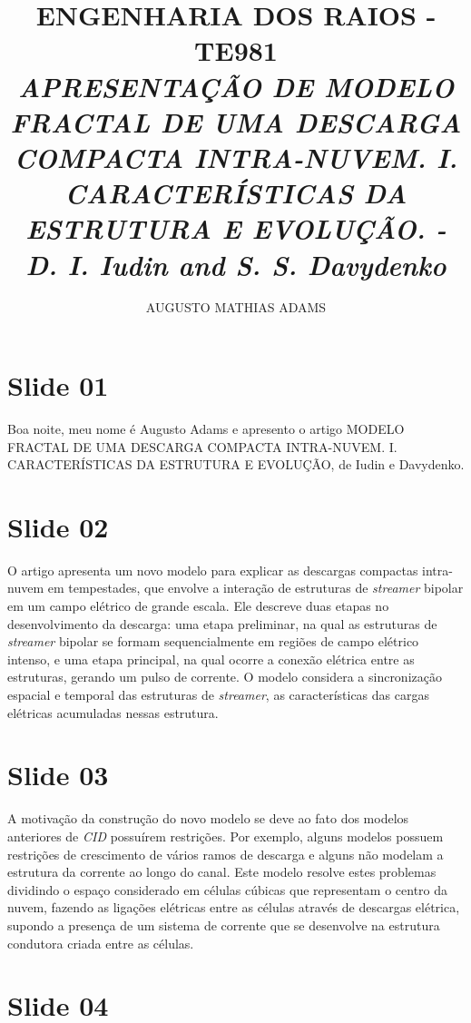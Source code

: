 \documentclass[a4paper, 12pt, onecolumn,singlespacing]{article}
\title{\normalsize{ENGENHARIA DOS RAIOS - TE981}\\ \huge{\textbf\textit{{APRESENTAÇÃO DE MODELO FRACTAL DE UMA DESCARGA COMPACTA INTRA-NUVEM. I. CARACTERÍSTICAS DA ESTRUTURA E EVOLUÇÃO. - D. I. Iudin and S. S. Davydenko}}\\}}
\author{\small{AUGUSTO MATHIAS ADAMS}}
\begin{document}
	
	\maketitle
	
	\section{Slide 01}
	
	Boa noite, meu nome é Augusto Adams e apresento o artigo MODELO FRACTAL DE UMA DESCARGA COMPACTA INTRA-NUVEM. I. CARACTERÍSTICAS DA ESTRUTURA E EVOLUÇÃO, de Iudin e Davydenko.
	
	\section{Slide 02}
	
		O artigo apresenta um novo modelo para explicar as descargas compactas intra-nuvem em tempestades, que envolve a interação de estruturas de \textit{streamer} bipolar em um campo elétrico de grande escala. Ele descreve duas etapas no desenvolvimento da descarga: uma etapa preliminar, na qual as estruturas de \textit{streamer} bipolar se formam sequencialmente em regiões de campo elétrico intenso, e uma etapa principal, na qual ocorre a conexão elétrica entre as estruturas, gerando um pulso de corrente. O modelo considera a sincronização espacial e temporal das estruturas de \textit{streamer}, as características das cargas elétricas acumuladas nessas estrutura.
	
	\section{Slide 03}
	
		A motivação da construção do novo modelo se deve ao fato dos modelos anteriores de \textit{CID} possuírem restrições. Por exemplo, alguns modelos possuem restrições de crescimento de vários ramos de descarga e alguns não modelam a estrutura da corrente ao longo do canal. Este modelo resolve estes problemas dividindo o espaço considerado em células cúbicas que representam o centro da nuvem, fazendo as ligações elétricas entre as células através de descargas elétrica, supondo a presença de um sistema de corrente que	se desenvolve na estrutura condutora criada entre as células.
		
	\section{Slide 04}
	
\end{document}
